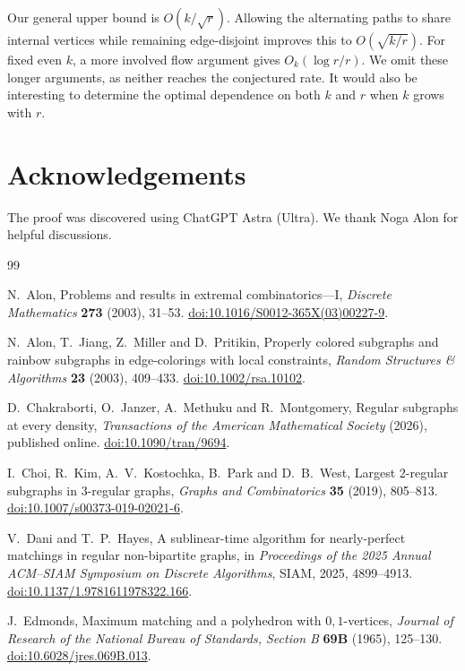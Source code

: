 \documentclass[11pt]{amsart}
\theoremstyle{remark}
\begin{document}
Our general upper bound is $O(k/\sqrt r)$. Allowing the alternating paths to share internal vertices while remaining edge-disjoint improves this to $O(\sqrt{k/r})$. For fixed even $k$, a more involved flow argument gives $O_k(\log r/r)$. We omit these longer arguments, as neither reaches the conjectured rate. It would also be interesting to determine the optimal dependence on both $k$ and $r$ when $k$ grows with $r$.

\section*{Acknowledgements}

The proof was discovered using ChatGPT Astra (Ultra). We thank Noga Alon for helpful discussions.

\begin{thebibliography}{99}

\raggedright

N.~Alon, Problems and results in extremal combinatorics---I,
\emph{Discrete Mathematics} \textbf{273} (2003), 31--53.
\href{https://doi.org/10.1016/S0012-365X(03)00227-9}{doi:10.1016/S0012-365X(03)00227-9}.

N.~Alon, T.~Jiang, Z.~Miller and D.~Pritikin, Properly colored subgraphs and rainbow subgraphs in edge-colorings with local constraints,
\emph{Random Structures \& Algorithms} \textbf{23} (2003), 409--433.
\href{https://doi.org/10.1002/rsa.10102}{doi:10.1002/rsa.10102}.

D.~Chakraborti, O.~Janzer, A.~Methuku and R.~Montgomery, Regular subgraphs at every density,
\emph{Transactions of the American Mathematical Society} (2026), published online.
\href{https://doi.org/10.1090/tran/9694}{doi:10.1090/tran/9694}.

I.~Choi, R.~Kim, A.~V.~Kostochka, B.~Park and D.~B.~West,
Largest $2$-regular subgraphs in $3$-regular graphs,
\emph{Graphs and Combinatorics} \textbf{35} (2019), 805--813.
\href{https://doi.org/10.1007/s00373-019-02021-6}{doi:10.1007/s00373-019-02021-6}.

V.~Dani and T.~P.~Hayes, A sublinear-time algorithm for nearly-perfect matchings in regular non-bipartite graphs,
in \emph{Proceedings of the 2025 Annual ACM--SIAM Symposium on Discrete Algorithms}, SIAM, 2025, 4899--4913.
\href{https://doi.org/10.1137/1.9781611978322.166}{doi:10.1137/1.9781611978322.166}.

J.~Edmonds, Maximum matching and a polyhedron with $0,1$-vertices,
\emph{Journal of Research of the National Bureau of Standards, Section B} \textbf{69B} (1965), 125--130.
\href{https://doi.org/10.6028/jres.069B.013}{doi:10.6028/jres.069B.013}.


\end{thebibliography}
\end{document}
